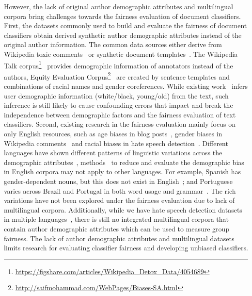 However, the lack of original author demographic attributes and multilingual corpora bring challenges towards the fairness evaluation of document classifiers.
First, the datasets commonly used to build and evaluate the fairness of document classifiers obtain derived synthetic author demographic attributes instead of the original author information.
The common data sources either derive from Wikipedia toxic comments~\cite{dixon2018measuring,park2018reducing,garg2019counterfactual} or synthetic document templates~\cite{kiritchenko2018examining,park2018reducing}.
The Wikipedia Talk corpus\footnote{\url{https://figshare.com/articles/Wikipedia_Detox_Data/4054689}}~\cite{wulczyn2017ex} provides demographic information of annotators instead of the authors, Equity Evaluation Corpus\footnote{\url{http://saifmohammad.com/WebPages/Biases-SA.html}}~\cite{kiritchenko2018examining} are created by sentence templates and combinations of racial names and gender coreferences.
While existing work~\cite{davidson2019racial,diaz2018addressing} infers user demographic information (white/black, young/old) from the text, such inference is still likely to cause confounding errors that impact and break the independence between demographic factors and the fairness evaluation of text classifiers.
Second, existing research in the fairness evaluation mainly focus on only English resources, such as age biases in blog posts~\cite{diaz2018addressing}, gender biases in Wikipedia comments~\cite{dixon2018measuring} and racial biases in hate speech detection~\cite{davidson2019racial}.
Different languages have shown different patterns of linguistic variations across the demographic attributes~\cite{johannsen2015cross,huang2019neural}, methods~\cite{zhao2017men,park2018reducing} to reduce and evaluate the demographic bias in English corpora may not apply to other languages. 
For example, Spanish has gender-dependent nouns, but this does not exist in English~\cite{sun2019mitigating}; and Portuguese varies across Brazil and Portugal in both word usage and grammar~\cite{maier2014language}.
The rich variations have not been explored under the fairness evaluation due to lack of multilingual corpora.
Additionally, while we have hate speech detection datasets in multiple languages~\cite{waseem2016hateful,sanguinetti2018italian,ptaszynski2017learning,basile2019semeval,fortuna2019hierarchically}, there is still no integrated multilingual corpora that contain author demographic attributes which can be used to measure group fairness.
The lack of author demographic attributes and multilingual datasets limits research for evaluating classifier fairness and developing unbiased classifiers.


